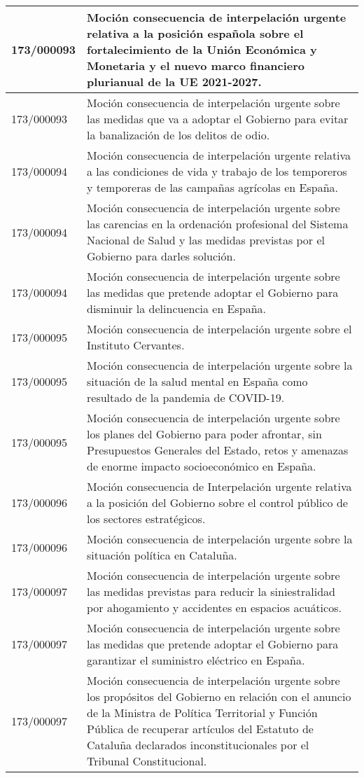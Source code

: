 {\begin{table}[H]
\begin{center}
\begin{tabularx}{\linewidth}{| l | X |}
\hline
173/000093 & Moción consecuencia de interpelación urgente relativa a la posición española sobre el fortalecimiento de la Unión Económica y Monetaria y el nuevo marco financiero plurianual de la UE 2021-2027. \\
\hline
173/000093 & Moción consecuencia de interpelación urgente sobre las medidas que va a adoptar el Gobierno para evitar la banalización de los delitos de odio. \\
\hline
173/000094 & Moción consecuencia de interpelación urgente relativa a las condiciones de vida y trabajo de los temporeros y temporeras de las campañas agrícolas en España. \\
\hline
173/000094 & Moción consecuencia de interpelación urgente sobre las carencias en la ordenación profesional del Sistema Nacional de Salud y las medidas previstas por el Gobierno para darles solución. \\
\hline
173/000094 & Moción consecuencia de interpelación urgente sobre las medidas que pretende adoptar el Gobierno para disminuir la delincuencia en España. \\
\hline
173/000095 & Moción consecuencia de interpelación urgente sobre el Instituto Cervantes. \\
\hline
173/000095 & Moción consecuencia de interpelación urgente sobre la situación de la salud mental en España como resultado de la pandemia de COVID-19. \\
\hline
173/000095 & Moción consecuencia de interpelación urgente sobre los planes del Gobierno para poder afrontar, sin Presupuestos Generales del Estado, retos y amenazas de enorme impacto socioeconómico en España. \\
\hline
173/000096 & Moción consecuencia de Interpelación urgente relativa a la posición del Gobierno sobre el control público de los sectores estratégicos. \\
\hline
173/000096 & Moción consecuencia de interpelación urgente sobre la situación política en Cataluña. \\
\hline
173/000097 & Moción consecuencia de interpelación urgente sobre las medidas previstas para reducir la siniestralidad por ahogamiento y accidentes en espacios acuáticos. \\
\hline
173/000097 & Moción consecuencia de interpelación urgente sobre las medidas que pretende adoptar el Gobierno para garantizar el suministro eléctrico en España. \\
\hline
173/000097 & Moción consecuencia de interpelación urgente sobre los propósitos del Gobierno en relación con el anuncio de la Ministra de Política Territorial y Función Pública de recuperar artículos del Estatuto de Cataluña declarados inconstitucionales por el Tribunal Constitucional. \\

\end{tabularx}
\end{center}
\end{table}}
